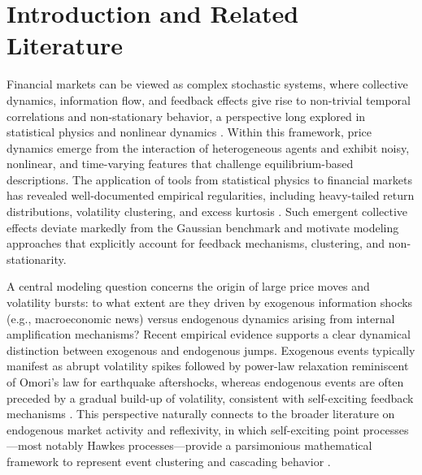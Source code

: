 \documentclass[final,5p,times,twocolumn]{elsarticle}
\begin{document}




\section{Introduction and Related Literature}
\label{sec:intro} 
Financial markets can be viewed as complex stochastic systems, where collective dynamics, information flow, and feedback effects give rise to non-trivial temporal correlations and non-stationary behavior, a perspective long explored in statistical physics and nonlinear dynamics \cite{schreiber2000,marschinski2002}.
Within this framework, price dynamics emerge from the interaction of heterogeneous agents and exhibit noisy, nonlinear, and time-varying features that challenge equilibrium-based descriptions.
The application of tools from statistical physics to financial markets has revealed well-documented empirical regularities, including heavy-tailed return distributions, volatility clustering, and excess kurtosis \cite{bouchaud2003theory, cont2000herd, mantegna1995}.
Such emergent collective effects deviate markedly from the Gaussian benchmark and motivate modeling approaches that explicitly account for feedback mechanisms, clustering, and non-stationarity.


A central modeling question concerns the origin of large price moves and volatility bursts: to what extent are they driven by exogenous information shocks (e.g., macroeconomic news) versus endogenous dynamics arising from internal amplification mechanisms?
Recent empirical evidence supports a clear dynamical distinction between exogenous and endogenous jumps.
Exogenous events typically manifest as abrupt volatility spikes followed by power-law relaxation reminiscent of Omori's law for earthquake aftershocks, whereas endogenous events are often preceded by a gradual build-up of volatility, consistent with self-exciting feedback mechanisms
\cite{Lallouache2020,Marcaccioli_2022}.
This perspective naturally connects to the broader literature on endogenous market activity and reflexivity, in which self-exciting point processes—most notably Hawkes processes—provide a parsimonious mathematical framework to represent event clustering and cascading behavior \cite{hawkes1971}.
\end{document}
